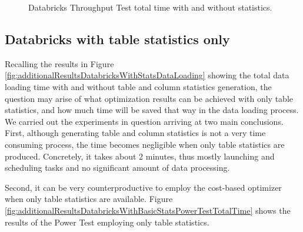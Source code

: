 \begin{figure}
   \begin{center}
   \end{center}
   \caption{Databricks Throughput Test total time with and without statistics.}
   \label{fig:additionalResultsDatabricksWithStatsTputTest}
\end{figure}

\subsection{Databricks with table statistics only}

Recalling the results in Figure \ref{fig:additionalResultsDatabricksWithStatsDataLoading} showing the total data loading time with and without table and column statistics generation, the question may arise of what optimization results can be achieved with only table statistics, and how much time will be saved that way in the data loading process. We carried out the experiments in question arriving at two main conclusions. First, although generating table and column statistics is not a very time consuming process, the time becomes negligible when only table statistics are produced. Concretely, it takes about 2 minutes, thus mostly launching and scheduling tasks and no significant amount of data processing.

Second, it can be very counterproductive to employ the cost-based optimizer when only table statistics are available. Figure \ref{fig:additionalResultsDatabricksWithBasicStatsPowerTestTotalTime} shows the results of the Power Test employing only table statistics.

